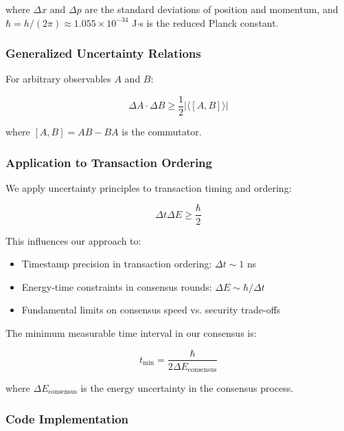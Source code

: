 \documentclass[11pt,a4paper]{article}
\newcommand{\qexpect}[1]{\langle#1\rangle}
\begin{document}
where $\Delta x$ and $\Delta p$ are the standard deviations of position and momentum, and $\hbar = h/(2\pi) \approx 1.055 \times 10^{-34}$ J$\cdot$s is the reduced Planck constant.

\subsubsection{Generalized Uncertainty Relations}

For arbitrary observables $A$ and $B$:

\begin{equation}
\Delta A \cdot \Delta B \geq \frac{1}{2}|\qexpect{[A,B]}|
\end{equation}

where $[A,B] = AB - BA$ is the commutator.

\subsubsection{Application to Transaction Ordering}

We apply uncertainty principles to transaction timing and ordering:

\begin{equation}
\Delta t \Delta E \geq \frac{\hbar}{2}
\label{eq:time-energy-uncertainty}
\end{equation}

This influences our approach to:
\begin{itemize}
    \item Timestamp precision in transaction ordering: $\Delta t \sim 1$ ns
    \item Energy-time constraints in consensus rounds: $\Delta E \sim \hbar/\Delta t$
    \item Fundamental limits on consensus speed vs. security trade-offs
\end{itemize}

The minimum measurable time interval in our consensus is:

\begin{equation}
t_{\text{min}} = \frac{\hbar}{2\Delta E_{\text{consensus}}}
\end{equation}

where $\Delta E_{\text{consensus}}$ is the energy uncertainty in the consensus process.

\subsubsection{Code Implementation}
\end{document}
